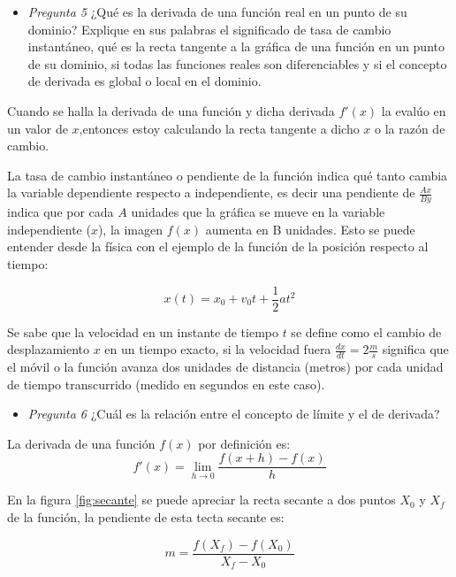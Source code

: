\begin{itemize}
    \item \textit{Pregunta 5} ¿Qué es la derivada de una función real en un punto de su dominio? Explique en sus palabras el significado de tasa de cambio instantáneo, qué es la recta tangente a la gráfica de una función en un punto de su dominio, si todas las funciones reales son diferenciables y si el concepto de derivada es global o local en el dominio.
\end{itemize}

Cuando se halla la derivada de una función y dicha derivada $f'(x)$ la evalúo en un valor de $x$,entonces estoy calculando la recta tangente a dicho $x$ o la razón de cambio.

La tasa de cambio instantáneo o pendiente de la función indica qué tanto cambia la variable dependiente respecto a independiente, es decir una pendiente de $\frac{Ax}{By}$ indica que por cada $A$ unidades que la gráfica se mueve en la variable independiente ($x$), la imagen $f(x)$ aumenta en B unidades. Esto se puede entender desde la física con el ejemplo de la función de la posición respecto al tiempo:

\begin{equation}
    x(t) = x_0 + v_0 t + \frac{1}{2} a t^2
    \label{eq:movimiento_variado}
\end{equation}

Se sabe que la velocidad en un instante de tiempo $t$ se define como el cambio de desplazamiento $x$ en un tiempo exacto, si la velocidad fuera $\frac{dx}{dt} = 2 \frac{m}{s}$ significa que el móvil o la función avanza dos unidades de distancia (metros) por cada unidad de tiempo transcurrido (medido en segundos en este caso).

\begin{itemize}
    \item \textit{Pregunta 6} ¿Cuál es la relación entre el concepto de límite y el de derivada?
\end{itemize}

La derivada de una función $f(x)$ por definición es:
\begin{equation}
    f'(x) = \lim_{{h \to 0}} \frac{f(x+h) - f(x)}{h}
    \label{eq:derivada}
\end{equation}

En la figura \ref{fig:secante} se puede apreciar la recta secante a dos puntos $X_0$ y $X_f$ de la función, la pendiente de esta tecta secante es:

\begin{equation}
    m = \frac{f(X_f) - f(X_0)}{X_f - X_0}
    \label{eq:pendiente_secante}
\end{equation}

